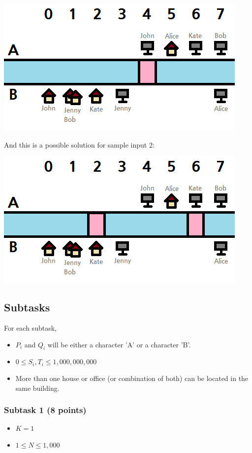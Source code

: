 \documentclass[a4paper]{article}
\begin{document}
\begin{center}
\includegraphics{bridge/bridge_1}
\end{center}

And this is a possible solution for sample input 2:

\begin{center}
\includegraphics{bridge/bridge_2}
\end{center}
\subsection*{Subtasks}
For each subtask,
\begin{itemize} \parskip0pt \itemsep1pt
\item $P_i$ and $Q_i$ will be either a character 'A' or a character 'B'.
\item $0 \le S_i, T_i \le 1,000,000,000$
\item More than one house or office (or combination of both) can be located in the same building.
\end{itemize}

\subsubsection*{Subtask 1 (8 points)}
\begin{itemize} \itemsep1pt \parskip0pt
\item $K = 1$
\item $1 \le N \le 1,000$
\end{itemize}
\end{document}
